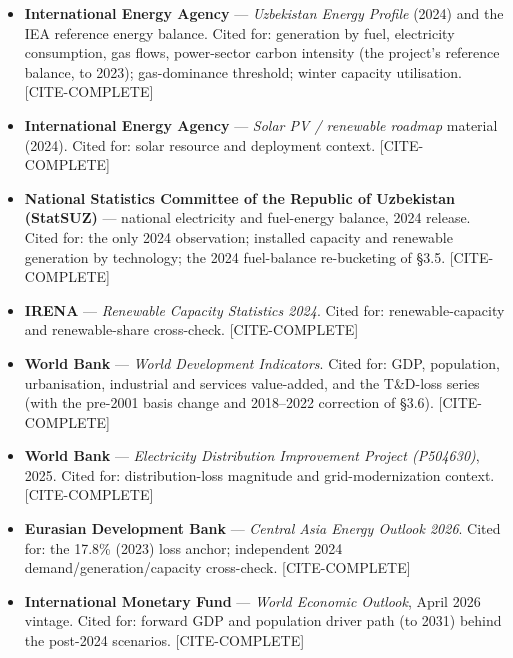 \documentclass[10pt,twocolumn]{article}
\newcommand{\mkdone}[1]{{\color{metagrey}\footnotesize #1}}
\begin{document}
\begin{itemize}[leftmargin=1.2em,itemsep=1pt,topsep=2pt]

\item \textbf{International Energy Agency} --- \textit{Uzbekistan Energy Profile} (2024) and the IEA reference energy balance. Cited for: generation by fuel, electricity consumption, gas flows, power-sector carbon intensity (the project's reference balance, to 2023); gas-dominance threshold; winter capacity utilisation. \mkdone{[CITE-COMPLETE]}

\item \textbf{International Energy Agency} --- \textit{Solar PV / renewable roadmap} material (2024). Cited for: solar resource and deployment context. \mkdone{[CITE-COMPLETE]}

\item \textbf{National Statistics Committee of the Republic of Uzbekistan (StatSUZ)} --- national electricity and fuel-energy balance, 2024 release. Cited for: the only 2024 observation; installed capacity and renewable generation by technology; the 2024 fuel-balance re-bucketing of \S{}3.5. \mkdone{[CITE-COMPLETE]}

\item \textbf{IRENA} --- \textit{Renewable Capacity Statistics 2024}. Cited for: renewable-capacity and renewable-share cross-check. \mkdone{[CITE-COMPLETE]}

\item \textbf{World Bank} --- \textit{World Development Indicators}. Cited for: GDP, population, urbanisation, industrial and services value-added, and the T\&D-loss series (with the pre-2001 basis change and 2018--2022 correction of \S{}3.6). \mkdone{[CITE-COMPLETE]}

\item \textbf{World Bank} --- \textit{Electricity Distribution Improvement Project (P504630)}, 2025. Cited for: distribution-loss magnitude and grid-modernization context. \mkdone{[CITE-COMPLETE]}

\item \textbf{Eurasian Development Bank} --- \textit{Central Asia Energy Outlook 2026}. Cited for: the 17.8\% (2023) loss anchor; independent 2024 demand/generation/capacity cross-check. \mkdone{[CITE-COMPLETE]}

\item \textbf{International Monetary Fund} --- \textit{World Economic Outlook}, April 2026 vintage. Cited for: forward GDP and population driver path (to 2031) behind the post-2024 scenarios. \mkdone{[CITE-COMPLETE]}


\end{itemize}
\end{document}
